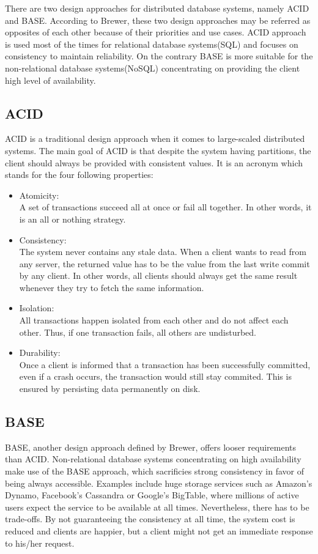 There are two design approaches for distributed database systems, namely ACID and BASE. According to Brewer, these two design approaches may be referred as opposites of each other because of their priorities and use cases. ACID approach is used most of the times for relational database systems(SQL) and focuses on consistency to maintain reliability. On the contrary BASE is more suitable for the non-relational database systems(NoSQL) concentrating on providing the client high level of availability.

\subsection{ACID}
\label{sec:background_acid}
ACID is a traditional design approach when it comes to large-scaled distributed systems. The main goal of ACID is that despite the system having partitions, the client should always be provided with consistent values. It is an acronym which stands for the four following properties:
\begin{itemize}
\item Atomicity:\\
A set of transactions succeed all at once or fail all together. In other words, it is an all or nothing strategy.
\item Consistency: \\
The system never contains any stale data. When a client wants to read from any server, the returned value has to be the value from the last write commit by any client. In other words, all clients should always get the same result whenever they try to fetch the same information.
\item Isolation:\\
All transactions happen isolated from each other and do not affect each other. Thus, if one transaction fails, all others are undisturbed.
\item Durability:\\
Once a client is informed that a transaction has been successfully committed, even if a crash occurs, the transaction would still stay commited. This is ensured by persisting data permanently on disk.
\end{itemize} 

\subsection{BASE}
\label{sec:background_base}
BASE, another design approach defined by Brewer, offers looser requirements than ACID. Non-relational database systems concentrating on high availability make use of the BASE approach, which sacrificies strong consistency in favor of being always accessible. Examples include huge storage services such as Amazon's Dynamo, Facebook's Cassandra or Google's BigTable, where millions of active users expect the service to be available at all times. Nevertheless, there has to be trade-offs. By not guaranteeing the consistency at all time, the system cost is reduced and clients are happier, but a client might not get an immediate response to his/her request.

